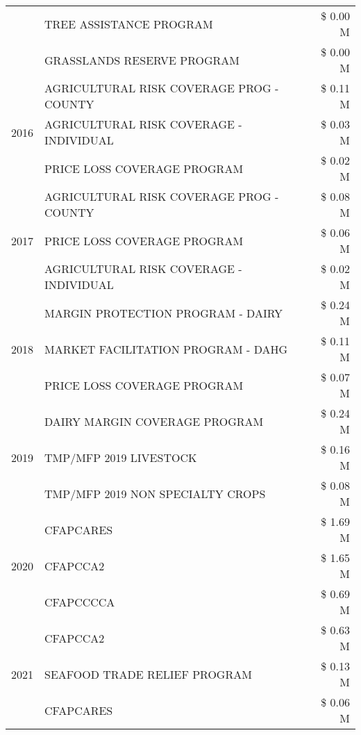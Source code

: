 \begin{tabular}{llr}
 & TREE ASSISTANCE PROGRAM & \$ 0.00 M \\
 & GRASSLANDS RESERVE PROGRAM & \$ 0.00 M \\
\cline{1-3}
\multirow[t]{3}{*}{2016} & AGRICULTURAL RISK COVERAGE PROG - COUNTY      & \$ 0.11 M \\
 & AGRICULTURAL RISK COVERAGE - INDIVIDUAL       & \$ 0.03 M \\
 & PRICE LOSS COVERAGE PROGRAM                   & \$ 0.02 M \\
\cline{1-3}
\multirow[t]{3}{*}{2017} & AGRICULTURAL RISK COVERAGE PROG - COUNTY & \$ 0.08 M \\
 & PRICE LOSS COVERAGE PROGRAM & \$ 0.06 M \\
 & AGRICULTURAL RISK COVERAGE - INDIVIDUAL & \$ 0.02 M \\
\cline{1-3}
\multirow[t]{3}{*}{2018} & MARGIN PROTECTION PROGRAM - DAIRY & \$ 0.24 M \\
 & MARKET FACILITATION PROGRAM - DAHG & \$ 0.11 M \\
 & PRICE LOSS COVERAGE PROGRAM & \$ 0.07 M \\
\cline{1-3}
\multirow[t]{3}{*}{2019} & DAIRY MARGIN COVERAGE PROGRAM & \$ 0.24 M \\
 & TMP/MFP 2019 LIVESTOCK & \$ 0.16 M \\
 & TMP/MFP 2019 NON SPECIALTY CROPS & \$ 0.08 M \\
\cline{1-3}
\multirow[t]{3}{*}{2020} & CFAPCARES & \$ 1.69 M \\
 & CFAPCCA2 & \$ 1.65 M \\
 & CFAPCCCCA & \$ 0.69 M \\
\cline{1-3}
\multirow[t]{3}{*}{2021} & CFAPCCA2 & \$ 0.63 M \\
 & SEAFOOD TRADE RELIEF PROGRAM & \$ 0.13 M \\
 & CFAPCARES & \$ 0.06 M \\
\cline{1-3}
\bottomrule
\end{tabular}
